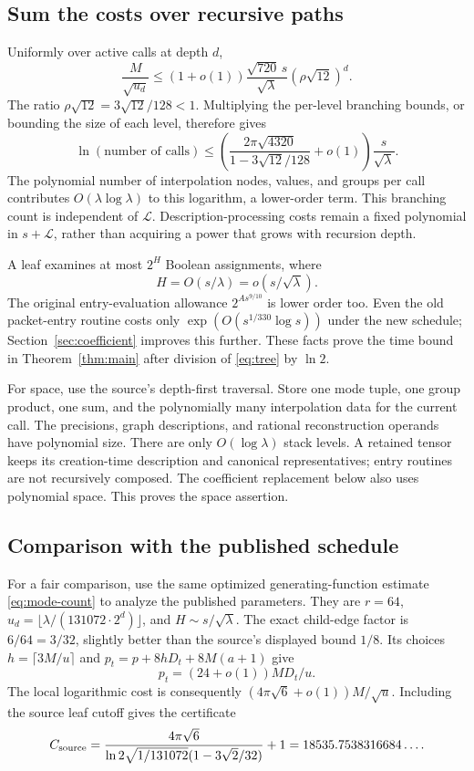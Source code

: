 \documentclass[11pt]{article}
\theoremstyle{remark}
\newcommand{\LL}{\mathcal L}
\begin{document}
\subsection{Sum the costs over recursive paths}

Uniformly over active calls at depth $d$,
\[
 \frac{M}{\sqrt{u_d}}
 \le(1+o(1))\frac{\sqrt{720}\,s}{\sqrt\lambda}
         (\rho\sqrt{12})^d.
\]
The ratio $\rho\sqrt{12}=3\sqrt{12}/128<1$. Multiplying the per-level branching bounds, or bounding the size of each level, therefore gives
\begin{equation}
 \ln(\text{number of calls})
 \le\left(\frac{2\pi\sqrt{4320}}
              {1-3\sqrt{12}/128}+o(1)\right)
       \frac{s}{\sqrt\lambda}.
 \label{eq:tree}
\end{equation}
The polynomial number of interpolation nodes, values, and groups per call contributes $O(\lambda\log\lambda)$ to this logarithm, a lower-order term. This branching count is independent of $\LL$. Description-processing costs remain a fixed polynomial in $s+\LL$, rather than acquiring a power that grows with recursion depth.

A leaf examines at most $2^H$ Boolean assignments, where
\[
 H=O(s/\lambda)=o(s/\sqrt\lambda).
\]
The original entry-evaluation allowance $2^{A s^{9/10}}$ is lower order too. Even the old packet-entry routine costs only $\exp(O(s^{1/330}\log s))$ under the new schedule; Section~\ref{sec:coefficient} improves this further. These facts prove the time bound in Theorem~\ref{thm:main} after division of \eqref{eq:tree} by $\ln2$.

For space, use the source's depth-first traversal. Store one mode tuple, one group product, one sum, and the polynomially many interpolation data for the current call. The precisions, graph descriptions, and rational reconstruction operands have polynomial size. There are only $O(\log\lambda)$ stack levels. A retained tensor keeps its creation-time description and canonical representatives; entry routines are not recursively composed. The coefficient replacement below also uses polynomial space. This proves the space assertion.

\subsection{Comparison with the published schedule}
\label{sec:comparison}

For a fair comparison, use the same optimized generating-function estimate \eqref{eq:mode-count} to analyze the published parameters. They are $r=64$, $u_d=\lfloor\lambda/(131072\cdot2^d)\rfloor$, and $H\sim s/\sqrt\lambda$. The exact child-edge factor is $6/64=3/32$, slightly better than the source's displayed bound $1/8$. Its choices $h=\lceil3M/u\rceil$ and $p_t=p+8hD_t+8M(a+1)$ give
\[
 p_t=(24+o(1))MD_t/u.
\]
The local logarithmic cost is consequently $(4\pi\sqrt6+o(1))M/\sqrt u$. Including the source leaf cutoff gives the certificate
\begin{equation}
 C_{\rm source}
 =\frac{4\pi\sqrt6}
 {\ln2\sqrt{1/131072}(1-3\sqrt2/32)}+1
 =18535.7538316684\ldots .\label{eq:old-constant}
\end{equation}
\end{document}
